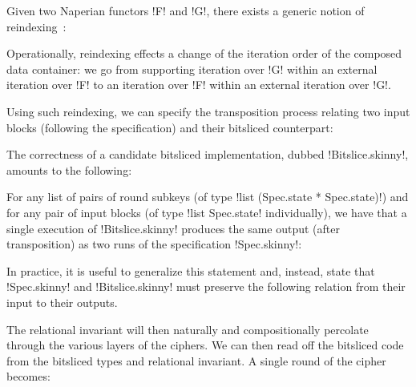 \documentclass[draft,english]{jflart}
\begin{document}

Given two Naperian functors \coqe!F! and \coqe!G!, there exists a
generic notion of reindexing~\citep{gibbons:apl}:
%

Operationally, reindexing effects a change of the iteration order of
the composed data container: we go from supporting iteration over
\coqe!G! within an external iteration over \coqe!F! to an iteration
over \coqe!F! within an external iteration over \coqe!G!.


Using such reindexing, we can specify the transposition process
relating two input blocks (following the specification) and their
bitsliced counterpart:
%


The correctness of a candidate bitsliced implementation, dubbed
\coqe!Bitslice.skinny!, amounts to the following:
%
\begin{theo}
  For any list of pairs of round subkeys (of type
  \coqe!list (Spec.state * Spec.state)!)
  and for any pair of input blocks (of type
  \coqe!list Spec.state!
  individually), we have that a single execution of
  \coqe!Bitslice.skinny! produces the same output (after
  transposition) as two runs of the specification \coqe!Spec.skinny!:

\end{theo}


In practice, it is useful to generalize this statement and, instead,
state that \coqe!Spec.skinny! and \coqe!Bitslice.skinny! must preserve
the following relation
%
%
from their input to their outputs.

The relational invariant will then naturally and compositionally
percolate through the various layers of the ciphers. We can then read
off the bitsliced code from the bitsliced types and relational
invariant. A single round of the cipher becomes:
%
\end{document}
